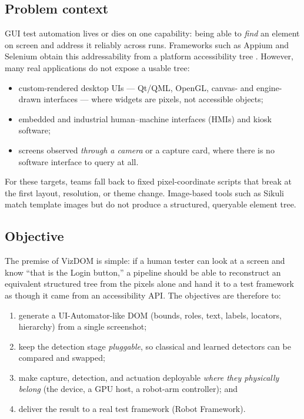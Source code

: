 \documentclass[11pt,a4paper]{article}
\begin{document}
\subsection{Problem context}
GUI test automation lives or dies on one capability: being able to \emph{find} an
element on screen and address it reliably across runs. Frameworks such as Appium
and Selenium obtain this addressability from a platform accessibility tree
\cite{uiautomator,appium}. However, many real applications do not expose a usable
tree:
\begin{itemize}[leftmargin=1.4em]
  \item custom-rendered desktop UIs --- Qt/QML, OpenGL, canvas- and
        engine-drawn interfaces --- where widgets are pixels, not accessible objects;
  \item embedded and industrial human--machine interfaces (HMIs) and kiosk software;
  \item screens observed \emph{through a camera} or a capture card, where there is
        no software interface to query at all.
\end{itemize}
For these targets, teams fall back to fixed pixel-coordinate scripts that break at
the first layout, resolution, or theme change. Image-based tools such as
Sikuli \cite{yeh2009sikuli} match template images but do not produce a structured,
queryable element tree.

\subsection{Objective}
The premise of VizDOM is simple: if a human tester can look at a screen and know
``that is the Login button,'' a pipeline should be able to reconstruct an
equivalent structured tree from the pixels alone and hand it to a test framework
as though it came from an accessibility API. The objectives are therefore to:
\begin{enumerate}[leftmargin=1.6em]
  \item generate a UI-Automator-like DOM (bounds, roles, text, labels, locators,
        hierarchy) from a single screenshot;
  \item keep the detection stage \emph{pluggable}, so classical and learned
        detectors can be compared and swapped;
  \item make capture, detection, and actuation deployable \emph{where they
        physically belong} (the device, a GPU host, a robot-arm controller); and
  \item deliver the result to a real test framework (Robot Framework).
\end{enumerate}
\end{document}
